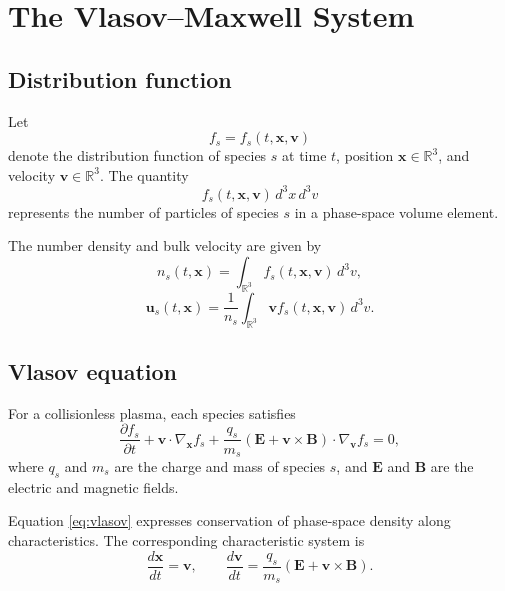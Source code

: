 \documentclass[11pt]{article}
\begin{document}
\section{The Vlasov--Maxwell System}

\subsection{Distribution function}
Let
\[
f_s = f_s(t,\bm{x},\bm{v})
\]
denote the distribution function of species \(s\) at time \(t\), position \(\bm{x}\in\mathbb{R}^3\), and velocity \(\bm{v}\in\mathbb{R}^3\). The quantity
\[
f_s(t,\bm{x},\bm{v})\,d^3x\,d^3v
\]
represents the number of particles of species \(s\) in a phase-space volume element.

The number density and bulk velocity are given by
\[
n_s(t,\bm{x}) = \int_{\mathbb{R}^3} f_s(t,\bm{x},\bm{v})\,d^3v,
\]
\[
\bm{u}_s(t,\bm{x}) = \frac{1}{n_s}\int_{\mathbb{R}^3}\bm{v} f_s(t,\bm{x},\bm{v})\,d^3v.
\]

\subsection{Vlasov equation}
For a collisionless plasma, each species satisfies
\begin{equation}
\frac{\partial f_s}{\partial t}
+ \bm{v}\cdot\nabla_{\bm{x}} f_s
+ \frac{q_s}{m_s}\left(\bm{E} + \bm{v}\times \bm{B}\right)\cdot\nabla_{\bm{v}} f_s
= 0,
\label{eq:vlasov}
\end{equation}
where \(q_s\) and \(m_s\) are the charge and mass of species \(s\), and \(\bm{E}\) and \(\bm{B}\) are the electric and magnetic fields.

Equation \eqref{eq:vlasov} expresses conservation of phase-space density along characteristics. The corresponding characteristic system is
\begin{equation}
\frac{d\bm{x}}{dt} = \bm{v}, \qquad
\frac{d\bm{v}}{dt} = \frac{q_s}{m_s}\left(\bm{E} + \bm{v}\times \bm{B}\right).
\label{eq:characteristics}
\end{equation}
\end{document}
